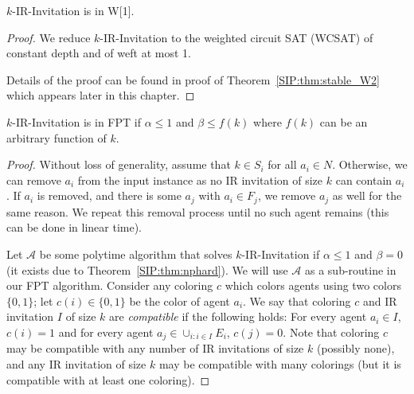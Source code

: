 \begin{theorem} \label{SIP:thm:IR_invitation_W1}
	$k$-IR-Invitation is in W[1].
\end{theorem} 
\begin{proof}
	We reduce $k$-IR-Invitation to the weighted circuit SAT (WCSAT) of constant depth and of weft at most 1. 
	
	Details of the proof can be found in proof of Theorem~\ref{SIP:thm:stable_W2} which appears later in this chapter.
\end{proof}


\begin{theorem} \label{SIP:thm:IR_invitation_FPT}
	$k$-IR-Invitation is in FPT if $\alpha \leq 1$ and $\beta \leq f(k)$ where $f(k)$ can be an arbitrary function of $k$. 
\end{theorem}
\begin{proof}
	Without loss of generality, assume that $k\in S_i$ for all $a_i \in N$.
	Otherwise, we can remove $a_i$ from the input instance as no IR invitation of size $k$ can contain $a_i$. If $a_i$ is removed, and there is some $a_j$ with $a_i \in F_j$, we remove $a_j$ as well for the same reason. We repeat this removal process until no such agent remains (this can be done in linear time).

	Let $\mathcal{A}$ be some polytime algorithm that solves $k$-IR-Invitation if $\alpha \leq 1$ and $\beta = 0$ (it exists due to Theorem~\ref{SIP:thm:nphard}). We will use $\mathcal{A}$ as a sub-routine in our FPT algorithm. Consider any coloring $c$ which colors agents using two colors $\{0,1\}$; let $c(i) \in \{0,1\}$ be the color of agent $a_i$.
	We say that coloring $c$ and IR invitation $I$ of size $k$ are {\em compatible} if the following holds: For every agent $a_i\in I$, $c(i) = 1$ and for every agent $a_j \in \cup_{i: i\in I} E_i$, $c(j) = 0$. 
	Note that coloring $c$ may be compatible with any number of IR invitations of size $k$ (possibly none), and any IR invitation of size $k$ may be compatible with many colorings (but it is compatible with at least one coloring).
	

\end{proof}
